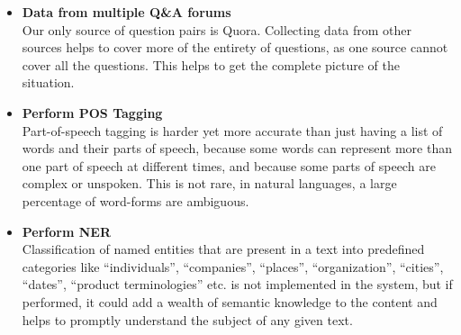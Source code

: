 \begin{itemize}
	\item \textbf{Data from multiple Q\&A forums} \\
	Our only source of question pairs is Quora. Collecting data from other sources helps to cover more of the entirety of questions, as one source cannot cover all the questions. This helps to get the complete picture of the situation.
	
	\item \textbf{Perform \acl{POS} Tagging} \\
	Part-of-speech tagging is harder yet more accurate than just having a list of words and their parts of speech, because some words can represent more than one part of speech at different times, and because some parts of speech are complex or unspoken. This is not rare, in natural languages, a large percentage of word-forms are ambiguous.
	
	\item {\textbf{Perform \acl{NER}}} \\
	Classification of named entities that are present in a text into predefined categories like “individuals”, “companies”, “places”, “organization”, “cities”, “dates”, “product terminologies” etc. is not implemented in the system, but if performed, it could add a wealth of semantic knowledge to the content and helps to promptly understand the subject of any given text.
\end{itemize}

\renewcommand\bibname{References} %



